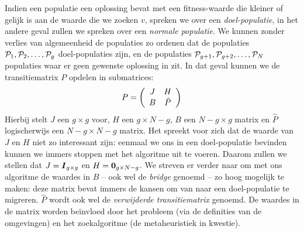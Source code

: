 Indien een populatie een oplossing bevat met een fitness-waarde die kleiner of gelijk is aan de waarde die we zoeken $v$, spreken we over een \emph{doel-populatie}, in het andere geval zullen we spreken over een \emph{normale populatie}. We kunnen zonder verlies van algemeenheid de populaties zo ordenen dat de populaties $\PopSet_1,\PopSet_2,\ldots,\PopSet_g$ doel-populaties zijn, en de populaties $\PopSet_{g+1},\PopSet_{g+2},\ldots,\PopSet_N$ populaties waar er geen gewenste oplossing in zit. In dat geval kunnen we de transitiematrix $P$ opdelen in submatrices:
\begin{equation}
P=\brak{\begin{array}{cc}
J&H\\
B&\hat{P}
\end{array}}
\end{equation}
Hierbij stelt $J$ een $g\times g$ voor, $H$ een $g\times N-g$, $B$ een $N-g\times g$ matrix en $\hat{P}$ logischerwijs een $N-g\times N-g$ matrix. Het spreekt voor zich dat de waarde van $J$ en $H$ niet zo interessant zijn: eenmaal we ons in een doel-populatie bevinden kunnen we immers stoppen met het algoritme uit te voeren. Daarom zullen we stellen dat $J=\identitymatrix[g\times g]$ en $H=\zeromatrix[g\times N-g]$. We streven er verder naar om met ons algoritme de waardes in $B$ -- ook wel de \emph{bridge} genoemd -- zo hoog mogelijk te maken: deze matrix bevat immers de kansen om van naar een doel-populatie te migreren. $\hat{P}$ wordt ook wel de \emph{verwijderde transitiematrix} genoemd. De waardes in de matrix worden be\"invloed door het probleem (via de definities van de omgevingen) en het zoekalgoritme (de metaheuristiek in kwestie).
